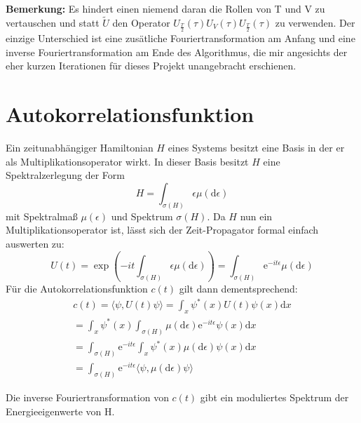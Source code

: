 \documentclass[10pt,a4paper,german]{scrartcl}
\begin{document}
		\textbf{Bemerkung:} Es hindert einen niemend daran die Rollen von T und V zu
		vertauschen	und statt $\tilde{U}$ den Operator
		$U_{\frac{T}{2}}(\tau) U_V(\tau) U_{\frac{T}{2}}(\tau)$ zu verwenden. Der einzige
		Unterschied ist eine zusätliche Fouriertransformation am Anfang und eine
		inverse Fouriertransformation am Ende des Algorithmus, die mir angesichts der
		eher kurzen Iterationen für dieses Projekt unangebracht erschienen.


  \section{Autokorrelationsfunktion}
		Ein zeitunabhängiger Hamiltonian $H$ eines Systems besitzt eine Basis in der er als
		Multiplikationsoperator wirkt. In dieser Basis besitzt $H$ eine Spektralzerlegung
		der Form
		\begin{equation*}
			H = \int_{\sigma(H)}{\epsilon \mu(\mathrm{d}\epsilon)}
		\end{equation*}
		mit Spektralmaß $\mu(\epsilon)$ und Spektrum $\sigma(H)$.
		Da $H$ nun ein Multiplikationsoperator ist, lässt sich der
		Zeit-Propagator formal einfach auswerten zu:
		\begin{equation*}
			U(t)=\exp\left(
				-i t \int_{\sigma(H)}{\epsilon \mu(\mathrm{d}\epsilon)}
			\right)
			=\int_{\sigma(H)}{\mathrm{e}^{-i t \epsilon} \mu(\mathrm{d}\epsilon)}
		\end{equation*}
		Für die Autokorrelationsfunktion $c(t)$
		gilt dann dementsprechend:
		\begin{multline}
			\label{eq:corr}
			c(t) = \langle \psi,U(t) \psi\rangle
					 = \int_{x} \psi^{*}(x) U(t) \psi(x) \mathrm{d}x \\
					 = \int_{x} \psi^{*}(x)
					 	  \int_{\sigma(H)}{\mu(\mathrm{d}\epsilon)
					 	    \mathrm{e}^{-i t \epsilon}} \psi(x) \mathrm{d}x \\
					 = \int_{\sigma(H)}{
					 			\mathrm{e}^{-i t \epsilon}
					 			 \int_{x} \psi^{*}(x) \mu(\mathrm{d}\epsilon) \psi(x) \mathrm{d}x} \\
					 = \int_{\sigma(H)}{
					 			\mathrm{e}^{-i t \epsilon}
					 			\langle \psi,\mu(\mathrm{d}\epsilon)\psi \rangle
					 			}
		\end{multline}
		
		
		Die inverse Fouriertransformation von $c(t)$ gibt ein moduliertes Spektrum
		der Energieeigenwerte von H.
\end{document}
